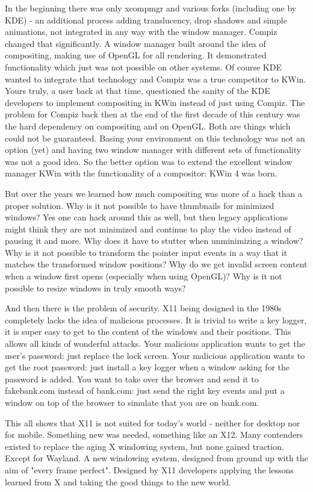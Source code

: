 In the beginning there was only xcompmgr and various forks (including one by KDE) - an additional process adding translucency, drop shadows and simple animations, not integrated in any way with the window manager. Compiz changed that significantly. A window manager built around the idea of compositing, making use of OpenGL for all rendering. It demonstrated functionality which just was not possible on other systems. Of course KDE wanted to integrate that technology and Compiz was a true competitor to KWin. Yours truly, a user back at that time, questioned the sanity of the KDE developers to implement compositing in KWin instead of just using Compiz. The problem for Compiz back then at the end of the first decade of this century was the hard dependency on compositing and on OpenGL. Both are things which could not be guaranteed. Basing your environment on this technology was not an option (yet) and having two window manager with different sets of functionality was not a good idea. So the better option was to extend the excellent window manager KWin with the functionality of a compositor: KWin 4 was born.

But over the years we learned how much compositing was more of a hack than a proper solution. Why is it not possible to have thumbnails for minimized windows? Yes one can hack around this as well, but then legacy applications might think they are not minimized and continue to play the video instead of pausing it and more. Why does it have to stutter when unminimizing a window? Why is it not possible to transform the pointer input events in a way that it matches the transformed window positions? Why do we get invalid screen content when a window first opens (especially when using OpenGL)? Why is it not possible to resize windows in truly smooth ways?

And then there is the problem of security. X11 being designed in the 1980s completely lacks the idea of malicious processes. It is trivial to write a key logger, it is super easy to get to the content of the windows and their positions. This allows all kinds of wonderful attacks. Your malicious application wants to get  the user's password: just replace the lock screen. Your malicious application wants to get the root password: just install a key logger when a window asking for the password is added. You want to take over the browser and send it to fakebank.com instead of bank.com: just send the right key events and put a window on top of the browser to simulate that you are on bank.com.

This all shows that X11 is not suited for today's world - neither for desktop nor for mobile. Something new was needed, something like an X12. Many contenders existed to replace the aging X windowing system, but none gained traction. Except for Wayland. A new windowing system, designed from ground up with the aim of "every frame perfect". Designed by X11 developers applying the lessons learned from X and taking the good things to the new world.

